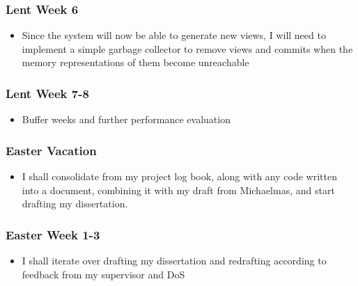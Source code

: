 \documentclass[12pt,a4paper,twoside,openright]{report}
\providecommand{\tightlist}{%
  \setlength{\itemsep}{0pt}\setlength{\parskip}{0pt}}
\begin{document}
\hypertarget{lent-week-6}{%
\subsubsection{Lent Week 6}\label{lent-week-6}}

\begin{itemize}
\tightlist
\item
  Since the system will now be able to generate new views, I will need
  to implement a simple garbage collector to remove views and commits
  when the memory representations of them become unreachable
\end{itemize}

\hypertarget{lent-week-7-8}{%
\subsubsection{Lent Week 7-8}\label{lent-week-7-8}}

\begin{itemize}
\tightlist
\item
  Buffer weeks and further performance evaluation
\end{itemize}

\hypertarget{easter-vacation}{%
\subsubsection{Easter Vacation}\label{easter-vacation}}

\begin{itemize}
\tightlist
\item
  I shall consolidate from my project log book, along with any code
  written into a document, combining it with my draft from Michaelmas,
  and start drafting my dissertation.
\end{itemize}

\hypertarget{easter-week-1-3}{%
\subsubsection{Easter Week 1-3}\label{easter-week-1-3}}

\begin{itemize}
\tightlist
\item
  I shall iterate over drafting my dissertation and redrafting according
  to feedback from my supervisor and DoS
\end{itemize}
\end{document}
